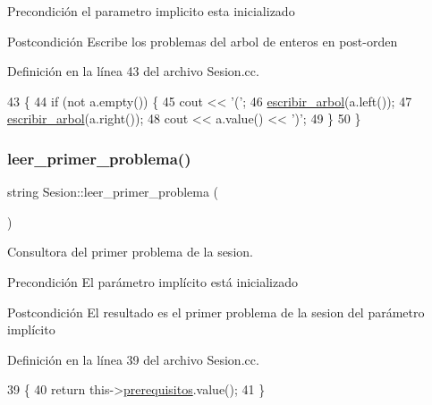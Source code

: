 \begin{DoxyPrecond}{Precondición}
el parametro implicito esta inicializado 
\end{DoxyPrecond}
\begin{DoxyPostcond}{Postcondición}
Escribe los problemas del arbol de enteros en post-\/orden 
\end{DoxyPostcond}


Definición en la línea 43 del archivo Sesion.\+cc.


\begin{DoxyCode}
43                                                     \{
44   \textcolor{keywordflow}{if} (not a.empty()) \{
45     cout << \textcolor{charliteral}{'('};
46     \mbox{\hyperlink{class_sesion_a05641874607ce3a3b3c495437938bf02}{escribir\_arbol}}(a.left());
47     \mbox{\hyperlink{class_sesion_a05641874607ce3a3b3c495437938bf02}{escribir\_arbol}}(a.right());
48     cout << a.value() << \textcolor{charliteral}{')'};
49   \}
50 \}
\end{DoxyCode}
\mbox{\label{class_sesion_a77b0408b1dba7df9a090e84ae9d56cba}} 
\subsubsection{\texorpdfstring{leer\+\_\+primer\+\_\+problema()}{leer\_primer\_problema()}}
{\footnotesize\ttfamily string Sesion\+::leer\+\_\+primer\+\_\+problema (\begin{DoxyParamCaption}{ }\end{DoxyParamCaption})}



Consultora del primer problema de la sesion. 

\begin{DoxyPrecond}{Precondición}
El parámetro implícito está inicializado 
\end{DoxyPrecond}
\begin{DoxyPostcond}{Postcondición}
El resultado es el primer problema de la sesion del parámetro implícito 
\end{DoxyPostcond}


Definición en la línea 39 del archivo Sesion.\+cc.


\begin{DoxyCode}
39                                     \{
40   \textcolor{keywordflow}{return} this->\mbox{\hyperlink{class_sesion_abdfe53bdef12bfa9ab510cad99b0de27}{prerequisitos}}.value();
41 \}
\end{DoxyCode}
\mbox{\label{class_sesion_aee7122e6303e811527e894a0f2d08fea}} 
